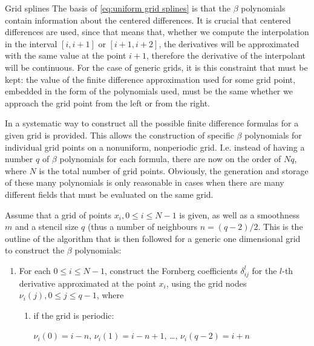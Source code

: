 \documentclass[11pt]{article}
\begin{document}
\begin{small}
\begin{paragraph}{Grid splines}
        The basis of \eqref{eq:uniform grid splines} is that the $\beta$ polynomials contain information about
        the centered differences.
        It is crucial that centered differences are used, since that means that, whether we compute the
        interpolation in the interval $[i, i+1]$ or $[i+1, i+2]$, the derivatives will be approximated with the
        same value at the point $i+1$, therefore the derivative of the interpolant will be continuous.
        For the case of generic grids, it is this constraint that must be kept: the value of the finite
        difference approximation used for some grid point, embedded in the form of the polynomials used, must
        be the same whether we approach the grid point from the left or from the right.

        In \cite{fornberg_generation_1988, fornberg_classroom_1998} a systematic way to construct all the
        possible finite difference formulas for a given grid is provided.
        This allows the construction of specific $\beta$ polynomials for individual grid points on a nonuniform,
        nonperiodic grid.
        I.e. instead of having a number $q$ of $\beta$ polynomials for each formula, there are now on the
        order of $Nq$, where $N$ is the total number of grid points.
        Obviously, the generation and storage of these many polynomials is only reasonable in cases when there
        are many different fields that must be evaluated on the same grid.

        Assume that a grid of points $x_i, 0 \leq i \leq N - 1$ is given, as well as a smoothness $m$ and a
        stencil size $q$ (thus a number of neighbours $n = (q-2)/2$.
        This is the outline of the algorithm that is then followed for a generic one dimensional grid to
        construct the $\beta$ polynomials:

        \begin{enumerate}
            \item
                For each $0 \leq i \leq N - 1$, construct the Fornberg coefficients $\delta_{ij}^l$ for the
                $l$-th derivative approximated at the point $x_i$, using the grid nodes $\nu_i(j), 0 \leq j \leq
                q - 1$, where

                \begin{enumerate}
                    \item
                        if the grid is periodic:

                        $\nu_i(0) = i - n$, $\nu_i(1) = i - n + 1$, \ldots, $\nu_i(q - 2) = i + n$


\end{enumerate}
\end{enumerate}
\end{paragraph}
\end{small}
\end{document}
